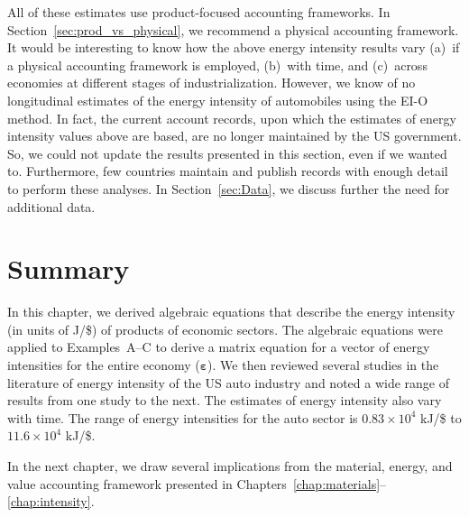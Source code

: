 All of these estimates use product-focused accounting frameworks.
In Section~\ref{sec:prod_vs_physical}, 
we recommend a physical accounting framework.
It would be interesting to know 
how the above energy intensity results vary
(a)~if a physical accounting framework is employed,
(b)~with time, and 
(c)~across economies at different stages of industrialization.
However, we know of no longitudinal estimates of the energy intensity of automobiles
using the EI-O method.
In fact, the current account records, upon which the estimates 
of energy intensity values above are based, are no longer
maintained by the US government. 
So, we could not update the results presented in this section, even if we wanted to.
Furthermore, few countries maintain and publish records with enough detail
to perform these analyses.
In Section~\ref{sec:Data}, we discuss further the need for additional data.


\section{Summary}
\label{sec:intensity_summary}

In this chapter, we derived algebraic equations that describe the energy intensity
(in units of J/\$) of products of economic sectors.
The algebraic equations were applied to Examples~A--C %
to derive a matrix equation
for a vector of energy intensities for the entire economy ($\boldsymbol{\varepsilon}$).
We then reviewed several studies in the literature of energy intensity 
of the US auto industry
and noted a wide range of results from one study to the next.
The estimates of energy intensity also vary with time.
The range of energy intensities for the auto sector 
is $0.83 \times 10^{4}$ kJ/\$ to $11.6 \times 10^{4}$ kJ/\$.

In the next chapter, we draw several implications 
from the material, energy, and value accounting framework presented in
Chapters~\ref{chap:materials}--\ref{chap:intensity}.







